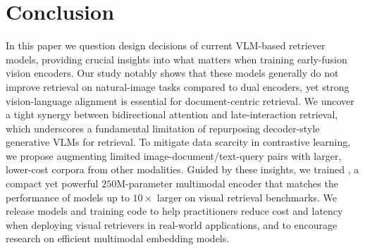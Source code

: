 \section{Conclusion}






In this paper we question design decisions of current VLM-based retriever models, providing crucial insights into what matters when training early-fusion vision encoders. Our study notably shows that these models generally do not improve retrieval on natural-image tasks compared to dual encoders, yet strong vision-language alignment is essential for document-centric retrieval. We uncover a tight synergy between bidirectional attention and late-interaction retrieval, which underscores a fundamental limitation of repurposing decoder-style generative VLMs for retrieval. To mitigate data scarcity in contrastive learning, we propose augmenting limited image-document/text-query pairs with larger, lower-cost corpora from other modalities. Guided by these insights, we trained \colflagship{}, a compact yet powerful $250$M-parameter multimodal encoder that matches the performance of models up to $10\times$ larger on visual retrieval benchmarks. We release models and training code to help practitioners reduce cost and latency when deploying visual retrievers in real-world applications, and to encourage research on efficient multimodal embedding models.

